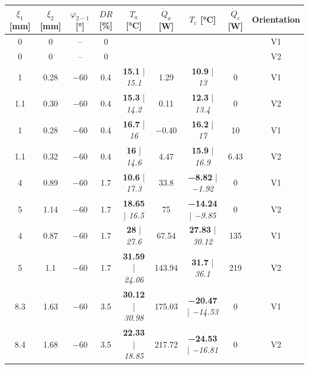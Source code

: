 \begin{table}[!ht]
\centering
	\begin{tabular}{ccccccccc}
		\hline
		$\xi_1$ [\unit{\mm}] & $\xi_2$ [\unit{\mm}] & $\varphi_{2-1}$ [\unit{\degree}] & $DR$ [\unit{\percent}] & $T_a$ [\unit{\degreeCelsius}] & $\dot Q_a$ [\unit{\W}] & $T_c$ [\unit{\degreeCelsius}] & $\dot Q_c$ [\unit{\W}] & Orientation \\\hline\hline
		\num{0} & \num{0} & -- & \num{0} & & & & & V1 \\
		\num{0} & \num{0} & -- & \num{0} & & & & & V2\\%
		\num{1} & \num{.28} & \num{-60} & \num{.4} & \textbf{\num{15.1}} | \textit{\num{15.1}} & \num{1.29} & \textbf{\num{10.9}} | \textit{\num{13}} & \num{0} & V1 \\
		\num{1.1} & \num{.30} & \num{-60} & \num{.4} & \textbf{\num{15.3}} | \textit{\num{14.2}}& \num{.11} & \textbf{\num{12.3}} | \textit{\num{13.4}} & \num{0} & V2 \\
		\num{1} & \num{.28} & \num{-60} & \num{.4} & \textbf{\num{16.7}} | \textit{\num{16}}& \num{-.40} & \textbf{\num{16.2}} | \textit{\num{17}} & \num{10} & V1 \\
		\num{1.1} & \num{.32} & \num{-60} & \num{.4} &\textbf{ \num{16}} | \textit{\num{14.6}} & \num{4.47} & \textbf{\num{15.9}} | \textit{\num{16.9}} & \num{6.43} & V2 \\%
		\num{4} & \num{.89} & \num{-60} & \num{1.7} & \textbf{\num{10.6}} | \textit{\num{17.3}} & \num{33.8} & \textbf{\num{-8.82}} | \textit{\num{-1.92}} & \num{0} & V1 \\
		\num{5} & \num{1.14} & \num{-60} & \num{1.7} & \textbf{\num{18.65}} | \textit{\num{16.5}} & \num{75} & \textbf{\num{-14.24}} | \textit{\num{-9.85}} & \num{0} & V2 \\
		\num{4} & \num{.87} & \num{-60} & \num{1.7} & \textbf{\num{28}} | \textit{\num{27.6}} & \num{67.54} & \textbf{\num{27.83}} | \textit{\num{30.12}}& \num{135} & V1 \\
		\num{5} & \num{1.1} & \num{-60} & \num{1.7} & \textbf{\num{31.59}} | \textit{\num{24.06}} & \num{143.94} & \textbf{\num{31.7}} | \textit{\num{36.1}} & \num{219} & V2 \\%
		\num{8.3} & \num{1.63} & \num{-60} & \num{3.5} & \textbf{\num{30.12}} | \textit{\num{30.98}} & \num{175.03} & \textbf{\num{-20.47}} | \textit{\num{-14.53}} & \num{0} & V1 \\
		\num{8.4} & \num{1.68} & \num{-60} & \num{3.5} & \textbf{\num{22.33}} | \textit{\num{18.85}} & \num{217.72} & \textbf{\num{-24.53}} | \textit{\num{-16.81}} & \num{0} & V2 \\

\end{tabular}
\end{table}
